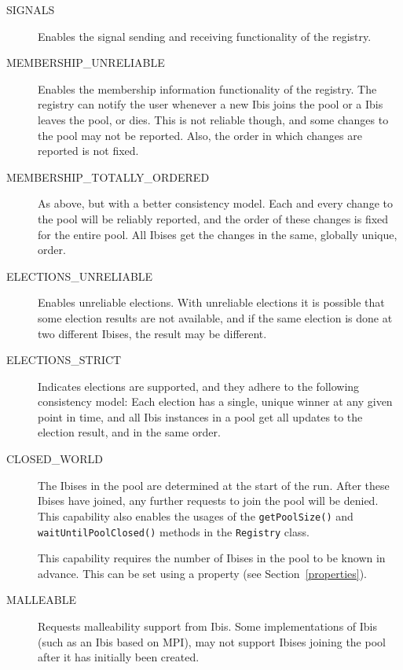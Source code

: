 \documentclass[10pt]{article}
\begin{document}
\begin{description}

\item[SIGNALS]
Enables the signal sending and receiving functionality of the registry.

\item[MEMBERSHIP\_UNRELIABLE] 
Enables the membership information functionality of the registry. The
registry can notify the user whenever a new Ibis joins the pool or a
Ibis leaves the pool, or dies. This is not reliable though, and some
changes to the pool may not be reported. Also, the order in which
changes are reported is not fixed.

\item[MEMBERSHIP\_TOTALLY\_ORDERED]
As above, but with a better consistency model. Each and every change to
the pool will be reliably reported, and the order of these changes is
fixed for the entire pool. All Ibises get the changes in the same,
globally unique, order.

\item[ELECTIONS\_UNRELIABLE] Enables unreliable elections. With
unreliable elections it is possible that some election results are not
available, and if the same election is done at two different Ibises, the
result may be different.

\item[ELECTIONS\_STRICT]
Indicates elections are supported, and they adhere to the following 
consistency model: Each election has a single, unique winner at any
given point in time, and all Ibis instances in a pool get all updates
to the election result, and in the same order.

\item[CLOSED\_WORLD] The Ibises in the pool are determined at the start
of the run. After these Ibises have joined, any further requests to join
the pool will be denied. This capability also enables the usages of the
\texttt{getPoolSize()} and \texttt{waitUntilPoolClosed()} methods in the
\texttt{Registry} class. 

This capability requires the number of Ibises
in the pool to be known in advance. This can be set using a property
(see Section~\ref{properties}).

\item[MALLEABLE]
Requests malleability support from Ibis. Some implementations of Ibis
(such as an Ibis based on MPI), may not support Ibises joining the pool
after it has initially been created.

\end{description}
\end{document}

